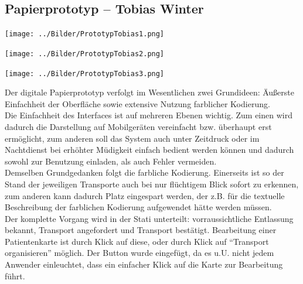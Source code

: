 \documentclass[a4paper, ngerman, 12pt]{scrartcl}
\begin{document}
\subsection{Papierprototyp – Tobias Winter}
\begin{center}
\begin{minipage}[b]{0.48\textwidth}
	\centering
	\texttt{[image: ../Bilder/PrototypTobias1.png]}
	\label{img:winter1}
\end{minipage}
\begin{minipage}[b]{0.48\textwidth}
	\centering
	\texttt{[image: ../Bilder/PrototypTobias2.png]}
	\label{img:winter2}
\end{minipage}
\end{center}
\begin{center}
\begin{minipage}{0.5\textwidth}
	\centering
	\texttt{[image: ../Bilder/PrototypTobias3.png]}
	\label{img:winter3}
\end{minipage}
\end{center}
Der digitale Papierprototyp verfolgt im Wesentlichen zwei Grundideen: Äußerste Einfachheit der Oberfläche sowie extensive Nutzung farblicher Kodierung.\\

Die Einfachheit des Interfaces ist auf mehreren Ebenen wichtig. Zum einen wird dadurch die Darstellung auf Mobilgeräten vereinfacht bzw. überhaupt erst ermöglicht, zum anderen soll das System auch unter Zeitdruck oder im Nachtdienst bei erhöhter Müdigkeit einfach bedient werden können und dadurch sowohl zur Benutzung einladen, als auch Fehler vermeiden.\\

Demselben Grundgedanken folgt die farbliche Kodierung. Einerseits ist so der Stand der jeweiligen Transporte auch bei nur flüchtigem Blick sofort zu erkennen, zum anderen kann dadurch Platz eingespart werden, der z.B. für die textuelle Beschreibung der farblichen Kodierung aufgewendet hätte werden müssen.\\
 
Der komplette Vorgang wird in der Stati unterteilt: vorraussichtliche Entlassung bekannt, Transport angefordert und Transport bestätigt. Bearbeitung einer Patientenkarte ist durch Klick auf diese, oder durch Klick auf “Transport organisieren” möglich. Der Button wurde eingefügt, da es u.U. nicht jedem Anwender einleuchtet, dass ein einfacher Klick auf die Karte zur Bearbeitung führt.
\end{document}
